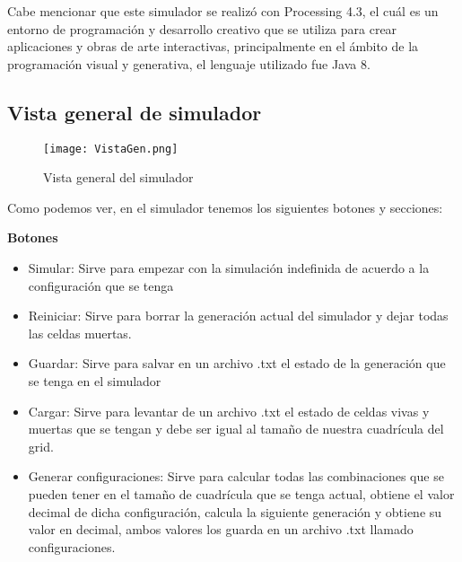 \documentclass{article}
\begin{document}
	Cabe mencionar que este simulador se realizó con Processing 4.3, el cuál es un entorno de programación y desarrollo creativo que se utiliza para crear aplicaciones y obras de arte interactivas, principalmente en el ámbito de la programación visual y generativa, el lenguaje utilizado fue Java 8. 
	
	\subsection{Vista general de simulador}
	
	\begin{figure}[htbp]
		\centering       
		\texttt{[image: VistaGen.png]}
		\caption{Vista general del simulador}
		\label{fig:mi_imagen} 
	\end{figure}
	
	Como podemos ver, en el simulador tenemos los siguientes botones y secciones:
	
	
	\textbf{Botones}
	\begin{itemize}
		
		\item Simular: Sirve para empezar con la simulación indefinida de acuerdo a la configuración que se tenga
		\item Reiniciar: Sirve para borrar la generación actual del simulador y dejar todas las celdas muertas. 
		\item Guardar: Sirve para salvar en un archivo .txt el estado de la generación que se tenga en el simulador
		\item Cargar: Sirve para levantar de un archivo .txt el estado de celdas vivas y muertas que se tengan y debe ser igual al tamaño de nuestra cuadrícula del grid. 
		\item Generar configuraciones: Sirve para calcular todas las combinaciones que se pueden tener en el tamaño de cuadrícula que se tenga actual, obtiene el valor decimal de dicha configuración, calcula la siguiente generación y obtiene su valor en decimal, ambos valores los guarda en un archivo .txt llamado configuraciones.
		
	\end{itemize}	
		
\end{document}
